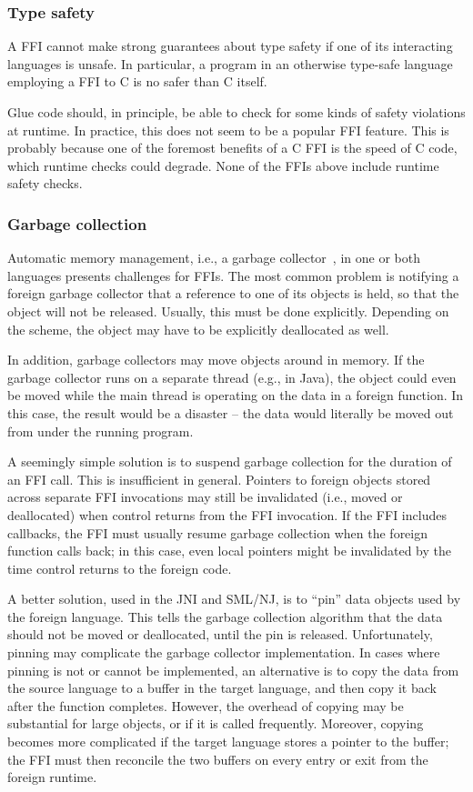 \subsubsection{Type safety}
\label{sec:ffi:safety}

A FFI cannot make strong guarantees about type safety if one of
its interacting languages is unsafe. In particular, a program in
an otherwise type-safe language employing a FFI to C is no safer
than C itself.

Glue code should, in principle, be able to check for some kinds of
safety violations at runtime. In practice, this does not seem to
be a popular FFI feature. This is probably because one of the
foremost benefits of a C FFI is the speed of C code, which runtime
checks could degrade. None of the FFIs above include runtime
safety checks.

\subsubsection{Garbage collection}
\label{sec:ffi:garbage}

Automatic memory management, i.e., a garbage
collector~\cite{appel98mlcompiler}, in one or both languages
presents challenges for FFIs. The most common problem is notifying
a foreign garbage collector that a reference to one of its objects
is held, so that the object will not be released. Usually, this
must be done explicitly. Depending on the scheme, the object may
have to be explicitly deallocated as well.

In addition, garbage collectors may move objects around in memory.
If the garbage collector runs on a separate thread (e.g., in
Java), the object could even be moved while the main thread is
operating on the data in a foreign function. In this case, the
result would be a disaster -- the data would literally be moved
out from under the running program.

A seemingly simple solution is to suspend garbage collection for
the duration of an FFI call. This is insufficient in general.
Pointers to foreign objects stored across separate FFI invocations
may still be invalidated (i.e., moved or deallocated) when control
returns from the FFI invocation. If the FFI includes callbacks,
the FFI must usually resume garbage collection when the foreign
function calls back; in this case, even local pointers might be
invalidated by the time control returns to the foreign code.

A better solution, used in the JNI and SML/NJ, is to ``pin'' data
objects used by the foreign language. This tells the garbage
collection algorithm that the data should not be moved or
deallocated, until the pin is released. Unfortunately, pinning may
complicate the garbage collector implementation. In cases where
pinning is not or cannot be implemented, an alternative is to copy
the data from the source language to a buffer in the target
language, and then copy it back after the function completes.
However, the overhead of copying may be substantial for large
objects, or if it is called frequently. Moreover, copying becomes
more complicated if the target language stores a pointer to the
buffer; the FFI must then reconcile the two buffers on every entry
or exit from the foreign runtime.

